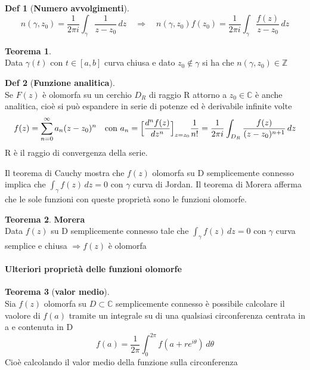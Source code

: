 \documentclass[a4paper,11pt]{report}
\theoremstyle{remark}
\theoremstyle{definition}
\newtheorem*{teo}{Teorema}
\newtheorem*{Def}{Def}
\begin{document}
	\begin{Def}[\textbf{Numero avvolgimenti}]
		\[n(\gamma,z_0) = \frac{1}{2 \pi i} \int_\gamma \frac{1}{z-z_0}\,dz \quad
		\Rightarrow \quad n(\gamma,z_0)f(z_0) = \frac{1}{2 \pi i} \int_\gamma \frac{f(z)}{z-z_0}\,dz\]
	\end{Def}

	\begin{teo}\hfil\\
		Data $\gamma(t)$ con $t \in [a,b]$ curva chiusa e dato $z_0 \notin \gamma$ si ha che $n(\gamma,z_0) \in \mathbb{Z}$
	\end{teo}

	\begin{Def}[\textbf{Funzione analitica}]\hfil\\
		Se $F(z)$ è olomorfa su un cerchio $D_R$ di raggio R attorno a $z_0 \in \mathbb{C}$ è anche analitica, cioè si può espandere in serie di potenze ed è derivabile infinite volte 
		\[f(z) =\sum_{n=0}^{\infty} a_n (z-z_0)^n \quad \mbox{con } a_n = \Bigl[\frac{d^n f(z)}{dz^n}\Bigr]_{z=z_0}\frac{1}{n!} = \frac{1}{2\pi i} \int_{D_R} \frac{f(z)}{(z-z_0)^{n+1}}\,dz\]
		R è il raggio di convergenza della serie.
	\end{Def}

	\noindent Il teorema di Cauchy mostra che $f(z)$ olomorfa su D semplicemente connesso implica che $\int_\gamma f(z)\,dz = 0$ con $\gamma$ curva di Jordan. \newline
	Il teorema di Morera afferma che le sole funzioni con queste proprietà sono le funzioni olomorfe.
	
	\begin{teo}{\textbf{Morera}}\hfil\\
		Data $f(z)$ su D semplicemente connesso tale che $\int_\gamma f(z)\,dz = 0$ con $\gamma$ curva semplice e chiusa \newline $\Rightarrow f(z)$ è olomorfa
	\end{teo}

	\paragraph{Ulteriori proprietà delle funzioni olomorfe}
	
	\begin{teo}[\textbf{valor medio}]\hfil\\
		Sia $f(z)$ olomorfa su $D \subset \mathbb{C}$ semplicemente connesso è possibile calcolare il vaolore di $f(a)$ tramite un integrale su di una qualsiasi circonferenza centrata in a e contenuta in D
		\[f(a)= \frac{1}{2\pi} \int_{0}^{2\pi} f(a+re^{i\theta})\,d\theta\]
		Cioè calcolando il valor medio della funzione sulla circonferenza
	\end{teo}
\end{document}
